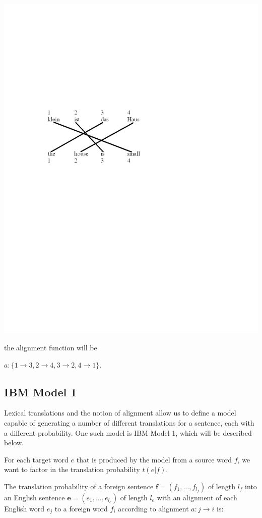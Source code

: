 \documentclass[11pt]{report}
\theoremstyle{plain}
\begin{document}
{\includegraphics[viewport = 100 400 400 550,clip]{constantin-figure2.pdf}

the alignment function will be

$a:\{1 \rightarrow 3, 2 \rightarrow 4, 3 \rightarrow 2, 4
\rightarrow 1\}$.


\subsection{IBM Model 1}

Lexical translations and the notion of alignment allow us to define
a model capable of generating a number of different translations for
a sentence, each with a different probability. One such model is IBM
Model 1, which will be described below.

For each target word $e$ that is produced by the model from a source
word $f$, we want to factor in the translation probability $t(e|f)$.

The translation probability of a foreign sentence
$\textbf{f}=(f_1,\dots,f_{l_f})$ of length $l_f$ into an English
sentence $\textbf{e}=(e_1,\dots, e_{l_e})$ of length $l_e$ with an
alignment of each English word $e_j$ to a foreign word $f_i$
according to alignment $a:j \rightarrow i$ is:

}
\end{document}

